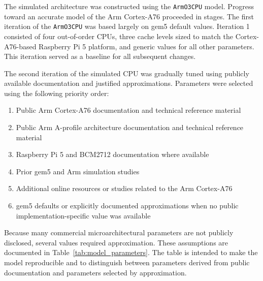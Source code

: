 \documentclass[acmlarge]{acmart}
\begin{document}
The simulated architecture was constructed using the \texttt{ArmO3CPU} model.
Progress toward an accurate model of the Arm Cortex-A76 proceeded in stages. The
first iteration of the \texttt{ArmO3CPU} was based largely on gem5 default
values. Iteration 1 consisted of four out-of-order CPUs, three cache levels sized
to match the Cortex-A76-based Raspberry Pi 5 platform, and generic values for all
other parameters. This iteration served as a baseline for all subsequent changes.

The second iteration of the simulated CPU was gradually tuned using publicly
available documentation and justified approximations. Parameters were selected
using the following priority order:

\begin{enumerate}
  \item Public Arm Cortex-A76 documentation and technical reference material \cite{armCortexA76Product,CortexOptimizationGuide}
  \item Public Arm A-profile architecture documentation and technical reference material \cite{arm-a-documentation}
  \item Raspberry Pi 5 and BCM2712 documentation where available
  \item Prior gem5 and Arm simulation studies
  \item Additional online resources or studies related to the Arm Cortex-A76
  \item gem5 defaults or explicitly documented approximations when no public implementation-specific value was available
\end{enumerate}

Because many commercial microarchitectural parameters are not publicly disclosed,
several values required approximation. These assumptions are documented in
Table~\ref{tab:model_parameters}. The table is intended to make the model
reproducible and to distinguish between parameters derived from public
documentation and parameters selected by approximation.
\end{document}

